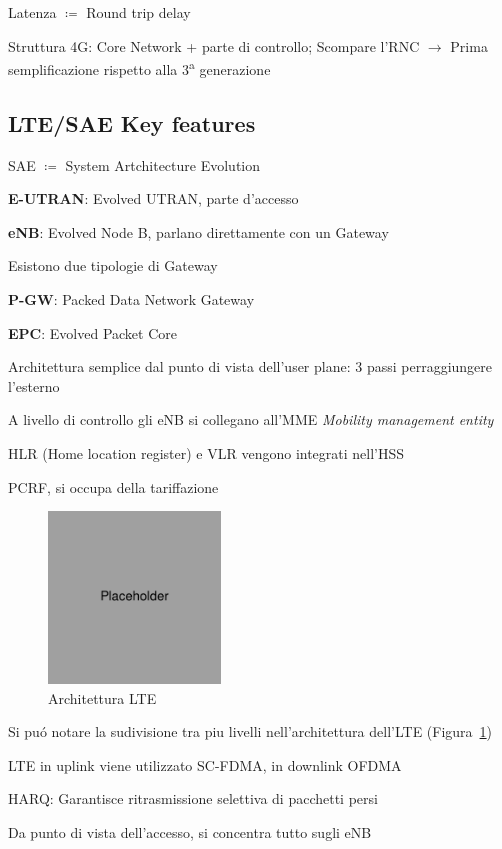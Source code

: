 \documentclass{article}
\begin{document}
Latenza $\coloneqq$ Round trip delay

Struttura 4G: Core Network + parte di controllo; Scompare l'RNC $\rightarrow$ Prima semplificazione rispetto alla 3\textsuperscript{a} generazione

\subsection{LTE/SAE Key features}
SAE $\coloneqq$ System Artchitecture Evolution

\textbf{E-UTRAN}: Evolved UTRAN, parte d'accesso

\textbf{eNB}: Evolved Node B, parlano direttamente con un Gateway

Esistono due tipologie di Gateway

\textbf{P-GW}: Packed Data Network Gateway

\textbf{EPC}: Evolved Packet Core

Architettura semplice dal punto di vista dell'user plane: 3 passi perraggiungere l'esterno

A livello di controllo gli eNB si collegano all'MME \textit{Mobility management entity}

HLR (Home location register) e VLR vengono integrati nell'HSS

PCRF, si occupa della tariffazione

\begin{figure}[h]
    \centering
    \includegraphics[width=1.8in]{placeholder.jpg}
    \caption{Architettura LTE}
    \label{fig:lte_architecture}
\end{figure}


Si pu\'o notare la sudivisione tra piu livelli nell'architettura dell'LTE (Figura~\ref{fig:lte_architecture})

LTE in uplink viene utilizzato SC-FDMA, in downlink OFDMA

HARQ: Garantisce ritrasmissione selettiva di pacchetti persi

Da punto di vista dell'accesso, si concentra tutto sugli eNB
\end{document}
